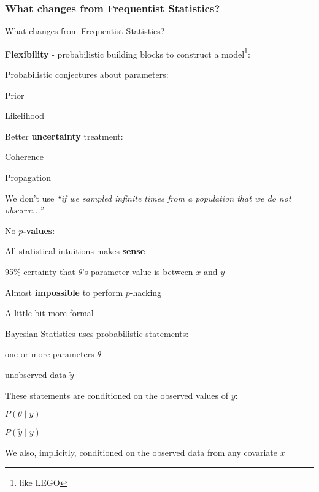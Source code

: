 \subsubsection{What changes from Frequentist Statistics?}
\begin{frame}{What changes from Frequentist Statistics?}
	\begin{vfilleditems}
		\item \textbf{Flexibility} - probabilistic building blocks to
		construct a model\footnote{like LEGO}:
		\begin{vfilleditems}
			\item Probabilistic conjectures about parameters:
			\begin{vfilleditems}
				\item Prior
				\item Likelihood
			\end{vfilleditems}
		\end{vfilleditems}
		\item Better \textbf{uncertainty} treatment:
		\begin{vfilleditems}
			\item Coherence
			\item Propagation
			\item We don't use \textit{``if we sampled infinite times
				from a population that we do not observe...''}
		\end{vfilleditems}
		\item No \textbf{$p$-values}:
		\begin{vfilleditems}
			\item All statistical intuitions makes \textbf{sense}
			\item 95\% certainty that $\theta$'s parameter value is
			between $x$ and $y$
			\item Almost \textbf{impossible} to perform $p$-hacking
		\end{vfilleditems}
	\end{vfilleditems}
\end{frame}

\begin{frame}{A little bit more formal}
	\begin{vfilleditems}
		\item Bayesian Statistics uses probabilistic statements:
		\begin{vfilleditems}
			\item one or more parameters $\theta$
			\item unobserved data $\tilde{y}$
		\end{vfilleditems}
		\item These statements are conditioned on the observed values of $y$:
		\begin{vfilleditems}
			\item $P(\theta \mid y)$
			\item $P(\tilde{y} \mid y)$
		\end{vfilleditems}
		\item We also, implicitly, conditioned on the observed data from
		any covariate $x$
	\end{vfilleditems}
\end{frame}

